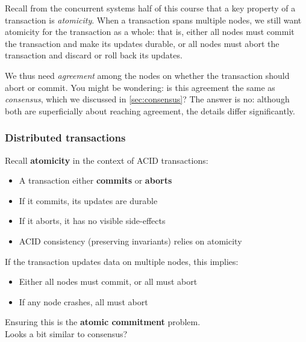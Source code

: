 Recall from the concurrent systems half of this course that a key property of a transaction is \emph{atomicity}.
When a transaction spans multiple nodes, we still want atomicity for the transaction as a whole: that is, either all nodes must commit the transaction and make its updates durable, or all nodes must abort the transaction and discard or roll back its updates.

We thus need \emph{agreement} among the nodes on whether the transaction should abort or commit.
You might be wondering: is this agreement the same as \emph{consensus}, which we discussed in \autoref{sec:consensus}?
The answer is no: although both are superficially about reaching agreement, the details differ significantly.

\begin{frame}
    \label{s:atomic-commit}
    \frametitle{Distributed transactions}
    Recall \textbf{atomicity} in the context of ACID transactions:
    \begin{itemize}
        \item A transaction either \textbf{commits} or \textbf{aborts}\pause
        \item If it commits, its updates are durable
        \item If it aborts, it has no visible side-effects\pause
        \item ACID consistency (preserving invariants) relies on atomicity\\[1em]\pause
    \end{itemize}
    If the transaction updates data on multiple nodes, this implies:
    \begin{itemize}
        \item Either all nodes must commit, or all must abort\pause
        \item If any node crashes, all must abort\\[1em]
    \end{itemize}
    Ensuring this is the \textbf{atomic commitment} problem.\\
    Looks a bit similar to consensus?
\end{frame}
\label{l:atomic-commit}

